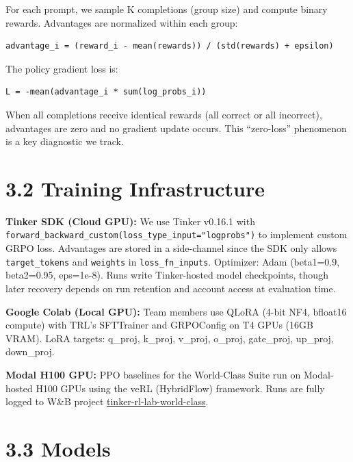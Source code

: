 \documentclass[
  american,
  11pt,
  a4paper,
  oneside]{report}
\begin{document}
For each prompt, we sample K completions (group size) and compute binary
rewards. Advantages are normalized within each group:

\begin{verbatim}
advantage_i = (reward_i - mean(rewards)) / (std(rewards) + epsilon)
\end{verbatim}

The policy gradient loss is:

\begin{verbatim}
L = -mean(advantage_i * sum(log_probs_i))
\end{verbatim}

When all completions receive identical rewards (all correct or all
incorrect), advantages are zero and no gradient update occurs. This
``zero-loss'' phenomenon is a key diagnostic we track.

\section{3.2 Training Infrastructure}\label{training-infrastructure}

\textbf{Tinker SDK (Cloud GPU):} We use Tinker v0.16.1 with
\texttt{forward\_backward\_custom(loss\_type\_input="logprobs")} to
implement custom GRPO loss. Advantages are stored in a side-channel
since the SDK only allows \texttt{target\_tokens} and \texttt{weights}
in \texttt{loss\_fn\_inputs}. Optimizer: Adam (beta1=0.9, beta2=0.95,
eps=1e-8). Runs write Tinker-hosted model checkpoints, though later
recovery depends on run retention and account access at evaluation time.

\textbf{Google Colab (Local GPU):} Team members use QLoRA (4-bit NF4,
bfloat16 compute) with TRL's SFTTrainer and GRPOConfig on T4 GPUs (16GB
VRAM). LoRA targets: q\_proj, k\_proj, v\_proj, o\_proj, gate\_proj,
up\_proj, down\_proj.

\textbf{Modal H100 GPU:} PPO baselines for the World-Class Suite run on
Modal-hosted H100 GPUs using the veRL (HybridFlow) framework. Runs are
fully logged to W\&B project
\href{https://wandb.ai/arvindcr4-pes-university/tinker-rl-lab-world-class}{tinker-rl-lab-world-class}.

\section{3.3 Models}\label{models}
\end{document}
